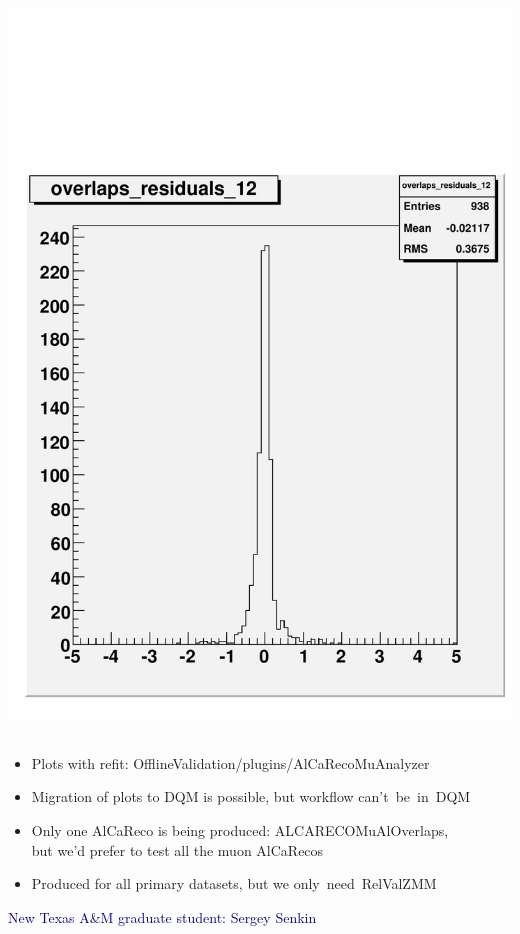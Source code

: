 \documentclass[compress]{beamer}
\begin{document}
\begin{frame}
\begin{columns}
\includegraphics[width=\linewidth]{example_residuals.pdf}
\end{columns}

\vfill
\begin{itemize}
\item Plots with refit: OfflineValidation/plugins/AlCaRecoMuAnalyzer
\item Migration of plots to DQM is possible, but workflow \mbox{can't be in DQM\hspace{-1 cm}}
\item Only one AlCaReco is being produced: ALCARECOMuAlOverlaps, \\ but we'd prefer to test all the muon AlCaRecos
\item Produced for all primary datasets, but we \mbox{only need RelValZMM\hspace{-1 cm}}
\end{itemize}

\vfill
\textcolor{darkblue}{\large New Texas A\&M graduate student: Sergey Senkin}

\end{frame}
\end{document}
